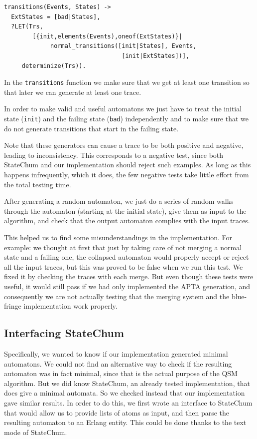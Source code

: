 \documentclass[]{sigplanconf}
\begin{document}
\begin{verbatim}
transitions(Events, States) ->
  ExtStates = [bad|States],
  ?LET(Trs, 
        [{init,elements(Events),oneof(ExtStates)}|
	         normal_transitions([init|States], Events, 
	                             [init|ExtStates])],
	 determinize(Trs)).
\end{verbatim}

In the \texttt{transitions} function we make sure that we get at least one transition
so that later we can generate at least one trace.

In order to make valid and useful automatons we just have to treat the
initial state (\texttt{init}) and the failing state (\texttt{bad})
independently and to make sure that we do not generate transitions
that start in the failing state.

Note that these generators can cause a trace to be both positive and negative, leading to inconsistency. This corresponds to a negative test, since both StateChum and our implementation should reject such examples. As long as this happens infrequently, which it does, the few negative tests take little effort from the total testing time.

After generating a random automaton, we just do a series of
random walks through the automaton (starting at the initial state),
give them as input to the algorithm, and check that the output automaton
complies with the input traces.

This helped us to find some misunderstandings in the implementation. For
example: we thought at first  that just by taking care of not
merging a normal state and a failing one, the collapsed automaton would
properly accept or reject all the input traces, but this was proved to
be false when we run this test. We fixed it by checking the traces with
each merge. But even though these tests were useful, it would still pass
if we had only implemented the APTA generation, and consequently we are
not actually testing that the merging system and the blue-fringe
implementation work properly.

\subsection{Interfacing StateChum}

Specifically, we wanted to know if our implementation generated minimal
automatons. We could not find an alternative way to check if the resulting
automaton was in fact minimal, since that is the actual purpose of the
QSM algorithm.
But we did know StateChum, an already tested implementation, that does give
a minimal automata. So we checked instead that our implementation gave similar
results. In order to do this, we first wrote an interface to StateChum
that would allow us to provide lists of atoms as input, and then parse the
resulting automaton to an Erlang entity. This could be done thanks to the
text mode of StateChum.
\end{document}

